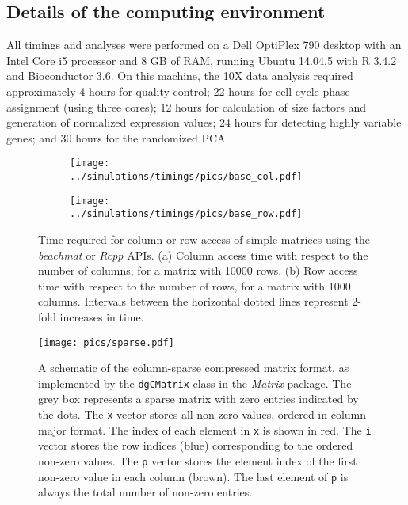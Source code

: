 \documentclass{article}
\newcommand{\beachmat}{\textit{beachmat}}
\begin{document}
\subsection{Details of the computing environment}
All timings and analyses were performed on a Dell OptiPlex 790 desktop with an Intel Core i5 processor and 8 GB of RAM, running Ubuntu 14.04.5 with R 3.4.2 and Bioconductor 3.6.
On this machine, the 10X data analysis required approximately 4 hours for quality control;
22 hours for cell cycle phase assignment (using three cores);
12 hours for calculation of size factors and generation of normalized expression values;
24 hours for detecting highly variable genes;
and 30 hours for the randomized PCA.




\newpage

\begin{figure}[bt]
    \centering
    \begin{subfigure}[b]{0.49\textwidth}
        \texttt{[image: ../simulations/timings/pics/base\_col.pdf]}
        \caption{}
    \end{subfigure}
    \begin{subfigure}[b]{0.49\textwidth}
        \texttt{[image: ../simulations/timings/pics/base\_row.pdf]}
        \caption{}
    \end{subfigure}
    \caption{Time required for column or row access of simple matrices using the \beachmat{} or \textit{Rcpp} APIs.
        (a) Column access time with respect to the number of columns, for a matrix with 10000 rows.
        (b) Row access time with respect to the number of rows, for a matrix with 1000 columns.
        Intervals between the horizontal dotted lines represent 2-fold increases in time.
    }
    \label{fig:basetime}
\end{figure}

\begin{figure}[bt]
    \centering
    \texttt{[image: pics/sparse.pdf]}
    \caption{A schematic of the column-sparse compressed matrix format, as implemented by the \texttt{dgCMatrix} class in the \textit{Matrix} package.
        The grey box represents a sparse matrix with zero entries indicated by the dots.
        The \texttt{x} vector stores all non-zero values, ordered in column-major format.
        The index of each element in \texttt{x} is shown in red.
        The \texttt{i} vector stores the row indices (blue) corresponding to the ordered non-zero values.
        The \texttt{p} vector stores the element index of the first non-zero value in each column (brown).
        The last element of \texttt{p} is always the total number of non-zero entries.
    }
    \label{fig:sparsefig}
\end{figure}
\end{document}
